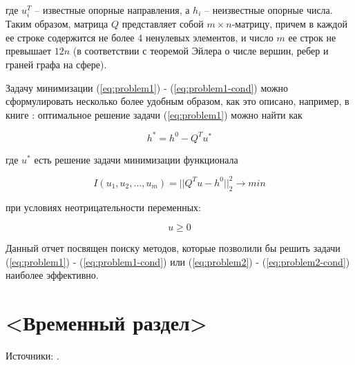 \documentclass[a4paper, 12pt, titlepage]{article}
\theoremstyle{definition}
\theoremstyle{plain}
\theoremstyle{plain}
\begin{document}
где $u_{i}^{T}$ -- известные опорные направления, а $h_{i}$ -- неизвестные
опорные числа. Таким образом, матрица $Q$ представляет собой $m \times
n$-матрицу, причем в каждой ее строке содержится не более 4 ненулевых элементов,
и число $m$ ее строк не превышает $12 n$ (в соответствии с теоремой Эйлера о
числе вершин, ребер и граней графа на сфере).

Задачу минимизации (\ref{eq:problem1}) - (\ref{eq:problem1-cond}) можно 
сформулировать несколько более удобным образом, как это описано, например, в 
книге \cite{BertsekasTsitsiklis1989}: оптимальное решение задачи
(\ref{eq:problem1}) можно найти как

\begin{equation}
\label{eq:problem2}
 h^{*} = h^{0} - Q^{T} u^{*}
\end{equation}

где $u^{*}$ есть решение задачи минимизации функционала

\begin{equation}
\label{eq:problem2-cond}
 I(u_{1}, u_{2}, \ldots, u_{m}) = ||Q^{T} u - h^{0}||_{2}^{2} \to min
\end{equation}

при условиях неотрицательности переменных:

\begin{equation}
 u \geq 0
\end{equation}

Данный отчет посвящен поиску методов, которые позволили бы решить задачи
(\ref{eq:problem1}) - (\ref{eq:problem1-cond}) или (\ref{eq:problem2}) -
(\ref{eq:problem2-cond}) наиболее эффективно.

\section{<Временный раздел>}

Источники: \cite{BertsekasTsitsiklis1989, BierlaireTointTuyttens1991,
CantarellaPiatek2004, ChenDonohoSaunders2001, Golub1965, Lanczos1950,
PaigeSaunders1982, Saunders2013}.

\newpage


\end{document}
